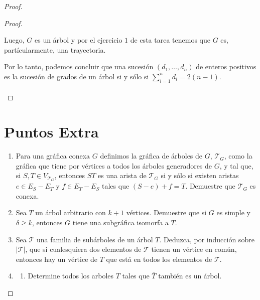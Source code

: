 \documentclass{article}
\begin{document}
\begin{enumerate}
\begin{proof}
\begin{enumerate}
\begin{proof}
\begin{itemize}
            Luego, $G$ es un \'arbol y por el ejercicio $1$ de esta tarea tenemos
            que $G$ es, part\'icularmente, una trayectoria.
        \end{itemize}
        Por lo tanto, podemos concluir que una sucesi\'on $(d_1, \dots,
        d_n)$ de enteros positivos es la sucesi\'on de grados de un \'arbol
        si y s\'olo si $\displaystyle \sum_{i=1}^n d_i = 2(n-1)$. \\
        \\
      \end{proof}
  \end{enumerate}

  \section*{Puntos Extra}
  \begin{enumerate}
    \item Para una gr\'afica conexa $G$ definimos la
      gr\'afica de \'arboles de $G$, $\mathcal{T}_G$,
      como la gr\'afica que tiene por v\'ertices a
      todos los \'arboles generadores de $G$, y tal que,
      si $S, T \in V_{\mathcal{T}_G}$, entonces $ST$ es
      una arista de $\mathcal{T}_G$ si y s\'olo si
      existen aristas $e \in E_S - E_T$ y $f \in E_T -
      E_S$ tales que $(S - e) + f = T$.   Demuestre que
      $\mathcal{T}_G$ es conexa.

    \item Sea $T$ un \'arbol arbitrario con $k+1$ v\'ertices.
      Demuestre que si $G$ es simple y $\delta \ge k$,
      entonces $G$ tiene una subgr\'afica isomorfa a $T$.

    \item Sea $\mathcal{T}$ una familia de sub\'arboles
      de un \'arbol $T$.   Deduzca, por inducci\'on sobre
      $|\mathcal{T}|$, que si cualesquiera dos elementos
      de $\mathcal{T}$ tienen un v\'ertice en com\'un,
      entonces hay un v\'ertice de $T$ que est\'a en
      todos los elementos de $\mathcal{T}$.

    \item \begin{enumerate}
      \item Determine todos los arboles $T$ tales que
        $\overline T$ tambi\'en es un \'arbol.


\end{enumerate}
\end{enumerate}
\end{proof}
\end{enumerate}
\end{document}
